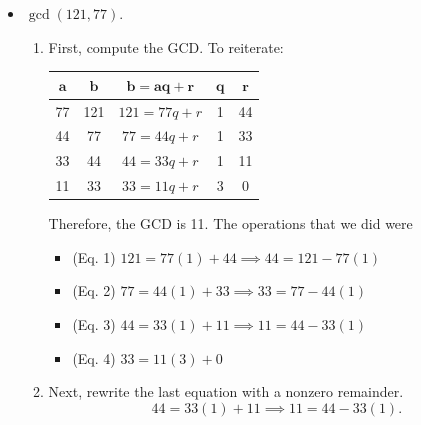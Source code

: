 \documentclass[letterpaper]{article}
\newcommand{\0}{\mathbf{0}}
\begin{document}
\begin{mdframed}
\begin{itemize}
\begin{mdframed}
        \end{mdframed}
        \item $\gcd(121, 77).$
        \begin{mdframed}
            \begin{enumerate}
                \item First, compute the GCD. To reiterate:
                \begin{center}
                    \begin{tabular}{|c|c|c|c|c|}
                        \hline 
                        $\mathbf{a}$ & $\mathbf{b}$ & $\mathbf{b = aq + r}$ & $\mathbf{q}$ & $\mathbf{r}$ \\ 
                        \hline 
                        77 & 121 & $121 = 77q + r$ & 1 & 44 \\ 
                        44 & 77 & $77 = 44q + r$ & 1 & 33 \\ 
                        33 & 44 & $44 = 33q + r$ & 1 & 11 \\ 
                        11 & 33 & $33 = 11q + r$ & 3 & 0 \\ 
                        \hline 
                    \end{tabular}
                \end{center}
                Therefore, the GCD is 11. The operations that we did were 
                \begin{itemize}
                    \item (Eq. 1) $121 = 77(1) + 44 \implies 44 = 121 - 77(1)$ 
                    \item (Eq. 2) $77 = 44(1) + 33 \implies 33 = 77 - 44(1)$
                    \item (Eq. 3) $44 = 33(1) + 11 \implies 11 = 44 - 33(1)$
                    \item (Eq. 4) $33 = 11(3) + 0$
                \end{itemize}

                \item Next, rewrite the last equation with a nonzero remainder.
                \[44 = 33(1) + 11 \implies 11 = 44 - 33(1).\]


\end{enumerate}
\end{mdframed}
\end{itemize}
\end{mdframed}
\end{document}
